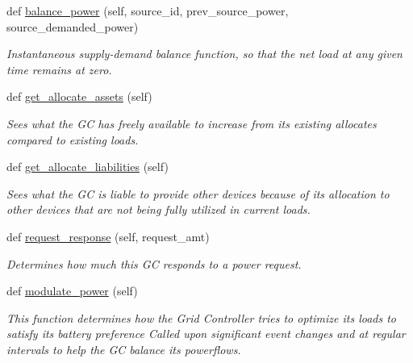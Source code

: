 \begin{DoxyCompactItemize}
def \hyperlink{class_build_1_1_objects_1_1grid__controller_1_1_grid_controller_aa099c2aaa311e87adde7bc663efc0779}{balance\+\_\+power} (self, source\+\_\+id, prev\+\_\+source\+\_\+power, source\+\_\+demanded\+\_\+power)
\begin{DoxyCompactList}\small\item\em Instantaneous supply-\/demand balance function, so that the net load at any given time remains at zero. \end{DoxyCompactList}\item 
def \hyperlink{class_build_1_1_objects_1_1grid__controller_1_1_grid_controller_a739bdc06f47603df13fa105dfcfaea10}{get\+\_\+allocate\+\_\+assets} (self)
\begin{DoxyCompactList}\small\item\em Sees what the GC has freely available to increase from its existing allocates compared to existing loads. \end{DoxyCompactList}\item 
def \hyperlink{class_build_1_1_objects_1_1grid__controller_1_1_grid_controller_ad984f42fc7530884d3c95fd1d4e5067e}{get\+\_\+allocate\+\_\+liabilities} (self)
\begin{DoxyCompactList}\small\item\em Sees what the GC is liable to provide other devices because of its allocation to other devices that are not being fully utilized in current loads. \end{DoxyCompactList}\item 
def \hyperlink{class_build_1_1_objects_1_1grid__controller_1_1_grid_controller_ad0475d0ecec8bd9541c940fb5e779dd1}{request\+\_\+response} (self, request\+\_\+amt)
\begin{DoxyCompactList}\small\item\em Determines how much this GC responds to a power request. \end{DoxyCompactList}\item 
\mbox{\label{class_build_1_1_objects_1_1grid__controller_1_1_grid_controller_a41968b1bd392919861dbc0de7f153f2f}} 
def \hyperlink{class_build_1_1_objects_1_1grid__controller_1_1_grid_controller_a41968b1bd392919861dbc0de7f153f2f}{modulate\+\_\+power} (self)
\begin{DoxyCompactList}\small\item\em This function determines how the Grid Controller tries to optimize its loads to satisfy its battery preference Called upon significant event changes and at regular intervals to help the GC balance its powerflows. \end{DoxyCompactList}\item 

\end{DoxyCompactItemize}
